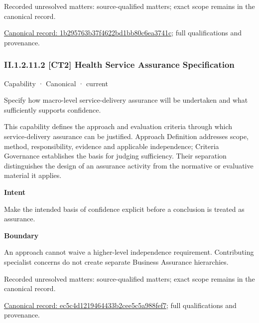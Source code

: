 {\small Recorded unresolved matters: source-qualified matters; exact scope remains in the canonical record.}\par
{\footnotesize \href{../../../../continuum/strategy/capability/1b295763b37f4622bd1bb80c6ea3741c.md}{Canonical record: 1b295763b37f4622bd1bb80c6ea3741c}; full qualifications and provenance.}\par
\subsubsection*{II.1.2.11.2 [CT2] Health Service Assurance Specification}
\label{navigation:II.1.2.11.2}

\label{element:ec5c4d1219464433b2cee5c5a988fef7}
{\small Capability · Canonical · current}\par

Specify how macro-level service-delivery assurance will be undertaken and what sufficiently supports confidence.



This capability defines the approach and evaluation criteria through which service-delivery assurance can be justified. Approach Definition addresses scope, method, responsibility, evidence and applicable independence; Criteria Governance establishes the basis for judging sufficiency. Their separation distinguishes the design of an assurance activity from the normative or evaluative material it applies.



\textbf{Intent}



Make the intended basis of confidence explicit before a conclusion is treated as assurance.



\textbf{Boundary}



An approach cannot waive a higher-level independence requirement. Contributing specialist concerns do not create separate Business Assurance hierarchies.


{\small Recorded unresolved matters: source-qualified matters; exact scope remains in the canonical record.}\par
{\footnotesize \href{../../../../continuum/strategy/capability/ec5c4d1219464433b2cee5c5a988fef7.md}{Canonical record: ec5c4d1219464433b2cee5c5a988fef7}; full qualifications and provenance.}\par
